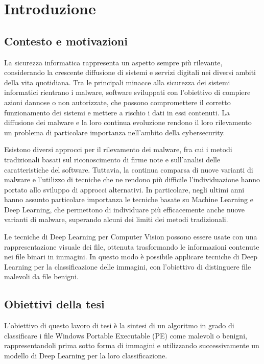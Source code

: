\chapter{Introduzione}

\section{Contesto e motivazioni}

La sicurezza informatica rappresenta un aspetto sempre più rilevante,
considerando la crescente diffusione di sistemi e servizi digitali nei
diversi ambiti della vita quotidiana.
Tra le principali minacce alla sicurezza dei sistemi informatici rientrano i malware,
software sviluppati con l'obiettivo di compiere azioni dannose o non autorizzate,
che possono compromettere il corretto funzionamento dei sistemi e mettere a rischio
i dati in essi contenuti. La diffusione dei malware e la loro continua evoluzione
rendono il loro rilevamento un problema di particolare importanza nell'ambito della cybersecurity.

Esistono diversi approcci per il rilevamento dei malware, fra cui i metodi tradizionali
basati sul riconoscimento di firme note e sull'analisi delle caratteristiche del software.
Tuttavia, la continua comparsa di nuove varianti di malware e l'utilizzo di tecniche che
ne rendono più difficile l'individuazione hanno portato allo sviluppo di approcci alternativi.
In particolare, negli ultimi anni hanno assunto particolare importanza le tecniche basate
su Machine Learning e Deep Learning, che permettono di individuare più efficacemente
anche nuove varianti di malware, superando alcuni dei limiti dei metodi tradizionali.

Le tecniche di Deep Learning per Computer Vision possono
essere usate con una rappresentazione visuale dei file, ottenuta
trasformando le informazioni contenute nei file binari in immagini.
In questo modo è possibile applicare tecniche di Deep Learning per la
classificazione delle immagini, con l'obiettivo di distinguere file
malevoli da file benigni.

\section{Obiettivi della tesi}

L'obiettivo di questo lavoro di tesi è la sintesi di un algoritmo in grado
di classificare i file Windows Portable Executable (PE) come malevoli o
benigni, rappresentandoli prima sotto forma di immagini e utilizzando
successivamente un modello di Deep Learning per la loro classificazione.

